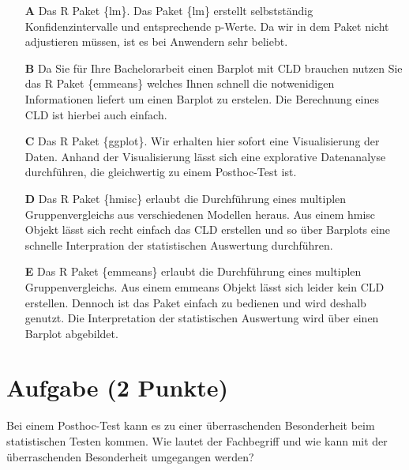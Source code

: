 \documentclass[a4paper, 9pt]{scrartcl}\usepackage[]{graphicx}\usepackage[]{xcolor}
\begin{document}
\begin{enumerate}
\item [\textbf{A} \msquare] Das R Paket \{lm\}. Das Paket \{lm\} erstellt selbstständig Konfidenzintervalle und entsprechende p-Werte. Da wir in dem Paket nicht adjustieren müssen, ist es bei Anwendern sehr beliebt.
\item [\textbf{B} \msquare] Da Sie für Ihre Bachelorarbeit einen Barplot mit CLD brauchen nutzen Sie das R Paket \{emmeans\} welches Ihnen schnell die notwenidigen Informationen liefert um einen Barplot zu erstelen. Die Berechnung eines CLD ist hierbei auch einfach.
\item [\textbf{C} \msquare] Das R Paket \{ggplot\}. Wir erhalten hier sofort eine Visualisierung der Daten. Anhand der Visualisierung lässt sich eine explorative Datenanalyse durchführen, die gleichwertig zu einem Posthoc-Test ist.
\item [\textbf{D} \msquare] Das R Paket \{hmisc\} erlaubt die Durchführung eines multiplen Gruppenvergleichs aus verschiedenen Modellen heraus. Aus einem hmisc Objekt lässt sich recht einfach das CLD erstellen und so über Barplots eine schnelle Interpration der statistischen Auswertung durchführen.
\item [\textbf{E} \msquare] Das R Paket \{emmeans\} erlaubt die Durchführung eines multiplen Gruppenvergleichs. Aus einem emmeans Objekt lässt sich leider kein CLD erstellen. Dennoch ist das Paket einfach zu bedienen und wird deshalb genutzt. Die Interpretation der statistischen Auswertung wird über einen Barplot abgebildet.
\end{enumerate}

\section{Aufgabe \hfill (2 Punkte)}



Bei einem Posthoc-Test kann es zu einer überraschenden Besonderheit beim statistischen Testen kommen. Wie lautet der Fachbegriff und wie kann mit der überraschenden Besonderheit umgegangen werden?
\end{document}

